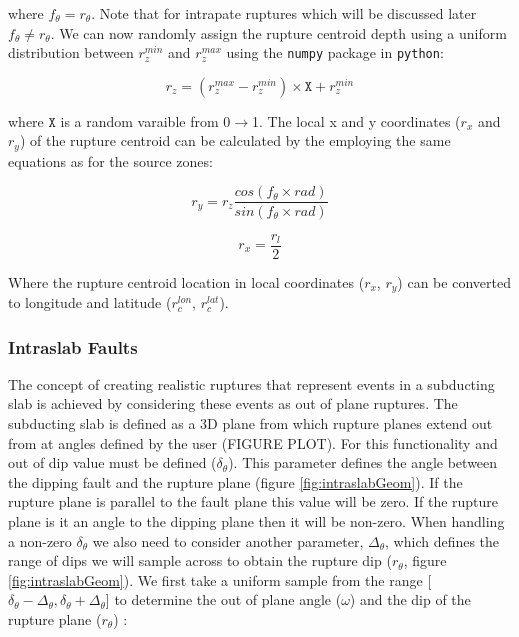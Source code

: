where $f_\theta = r_\theta$. Note that for intrapate ruptures which will be discussed later $f_\theta \ne r_\theta$. 
We can now randomly assign the rupture centroid depth using a uniform distribution between $r_z^{min}$ and $r_z^{max}$ 
using the \texttt{numpy} package in \texttt{python}:

\begin{equation} \label{eq:rand}
	r_z = ( r_z^{max}-r_z^{min} ) \times  \mathtt{X} +   r_z^{min}
\end{equation}

where $\mathtt{X}$ is a random varaible from 0$\rightarrow$1. The local x and y coordinates ($r_x$ and $r_y$) of the rupture 
centroid can be calculated by the employing the same equations as for the source zones:

\begin{equation}
r_y = r_z  \frac{cos(f_\theta  \times rad)}{sin(f_\theta  \times rad)}
\end{equation}

\begin{equation}
r_x = \frac{r_l}{2}
\end{equation}

Where the rupture centroid location in local coordinates ($r_x$, $r_y$) can be converted to longitude and latitude ($r_c^{lon}$, $r_c^{lat}$).

\subsubsection{Intraslab Faults}

The concept of creating realistic ruptures that represent events in a subducting slab is achieved by considering these events as 
out of plane ruptures. The subducting slab is defined as a 3D plane from which rupture planes extend out from at angles defined by
the user (FIGURE PLOT). For this functionality and out of dip value must be defined ($\delta_\theta$). 
This parameter defines the angle between the dipping fault and the rupture plane (figure \ref{fig:intraslabGeom}). If the rupture 
plane is parallel to the fault plane this value will be zero. If the rupture plane is it an angle to the dipping plane then it 
will be non-zero. When handling a non-zero $\delta_\theta$ we also need to consider another parameter, $\Delta_\theta$, which 
defines the range of dips we will sample across to obtain the rupture dip ($r_\theta$, figure \ref{fig:intraslabGeom}).
We first take a uniform sample from the range [$\delta_\theta - \Delta_\theta, \delta_\theta + \Delta_\theta$]  to determine 
the out of plane angle ($\omega$) and the dip of the rupture plane ($r_\theta$) :


